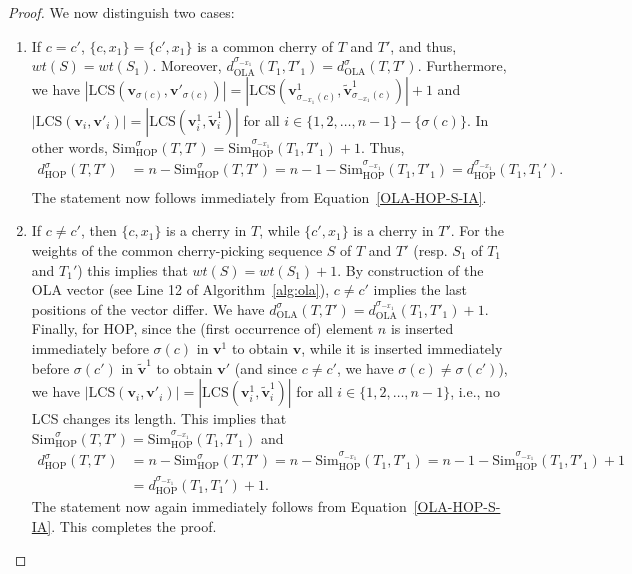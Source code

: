 \documentclass{article}
\newcommand{\HOP}{\mathrm{HOP}}
\newcommand{\OLA}{\mathrm{OLA}}
\begin{document}
\begin{proof}
We now distinguish two cases:
\begin{enumerate}[label={\upshape(\roman*)}]
    \item If $c = c'$, $\{c, x_1\} = \{c',x_1\}$ is a common cherry of $T$ and $T'$, and thus, $wt(S)=wt(S_1)$. Moreover, $d_{\OLA}^{\sigma_{-x_1}}(T_1,T'_1) = d_{\OLA}^\sigma (T,T')$. Furthermore, we have $|\text{LCS}(\mathbf{v}_{\sigma(c)},\mathbf{v}'_{\sigma(c)})| = |\text{LCS}(\mathbf{v}^1_{\sigma_{-x_1}(c)},\mathbf{\widetilde{v}}^1_{\sigma_{- x_1}(c)})| + 1$ and $| \text{LCS}(\mathbf{v}_i, \mathbf{v}'_i)| = | \text{LCS}(\mathbf{v}^1_i, \mathbf{\widetilde{v}}^1_i)|$ for all $i \in \{1, 2,\ldots, n-1\} - \{\sigma(c)\}$. In other words, $\text{Sim}^\sigma_{\HOP}(T,T') = \text{Sim}^{\sigma_{- x_1}}_{\HOP}(T_1,T'_1)+1$. Thus,
    \begin{align*}
        d_{\HOP}^\sigma (T, T') &= n - \text{Sim}^\sigma_{\HOP}(T,T') 
        = n - 1 - \text{Sim}^{\sigma_{- x_1}}_{\HOP}(T_1,T'_1) = d_{\HOP}^{\sigma_{- x_1}}(T_1, T_1'). \\
    \end{align*}
    The statement now follows immediately from Equation~\eqref{OLA-HOP-S-IA}.

    \item If $c \neq c'$, then $\{c,x_1\}$ is a cherry in $T$, while $\{c',x_1\}$ is a cherry in $T'$. For the weights of the common cherry-picking sequence $S$ of $T$ and $T'$ (resp. $S_1$ of $T_1$ and $T_1'$) this implies that $wt(S) = wt(S_1) + 1$. By construction of the OLA vector (see Line 12 of Algorithm~\ref{alg:ola}), $c \neq c'$ implies the last positions of the vector differ.  We have $d_{\OLA}^\sigma(T,T') = d_{\OLA}^{\sigma_{- x_1}}(T_1, T'_1)+1$. Finally, for HOP, since the (first occurrence of) element $n$ is inserted immediately before $\sigma(c)$ in $\mathbf{v}^1$ to obtain $\mathbf{v}$, while it is inserted immediately before $\sigma(c')$ in $\mathbf{\widetilde{v}}^1$ to obtain $\mathbf{v}'$ (and since $c \neq c'$, we have $\sigma(c) \neq \sigma(c')$), we have $| \text{LCS}(\mathbf{v}_i, \mathbf{v}'_i)| = | \text{LCS}(\mathbf{v}^1_i, \mathbf{\widetilde{v}}^1_i)|$ for all $i \in \{1,2, \ldots, n-1\}$, i.e., no LCS changes its length. This implies that $\text{Sim}^\sigma_{\HOP}(T,T') = \text{Sim}^{\sigma_{- x_1}}_{\HOP}(T_1,T'_1)$ and 
    \begin{align*}
        d_{\HOP}^\sigma (T, T') &= n - \text{Sim}^\sigma_{\HOP}(T,T') 
        = n - \text{Sim}^{\sigma_{- x_1}}_{\HOP}(T_1,T'_1) 
        = n - 1 - \text{Sim}^{\sigma_{- x_1}}_{\HOP}(T_1,T'_1) + 1 \\
        &= d_{\HOP}^{\sigma_{- x_1}}(T_1, T_1') + 1. 
    \end{align*}
    The statement now again immediately follows from Equation~\eqref{OLA-HOP-S-IA}. This completes the proof.
\end{enumerate}
 \end{proof} 
\end{document}
